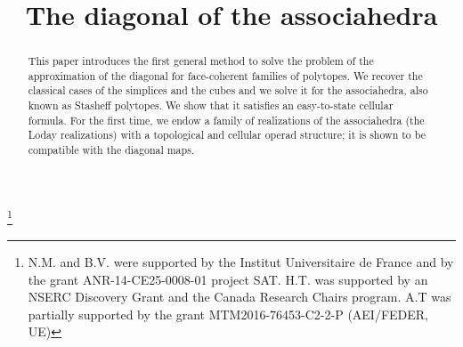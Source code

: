 \documentclass[JEP,XML,SOM,Unicode,NoFloatCountersInSection]{cedram}
\theoremstyle{plain}
\theoremstyle{definition}
\begin{document}
\frontmatter
\title{The diagonal of the associahedra}

\author[\initial{N.} \lastname{Masuda}]{ }
\address{Johns Hopkins University,
Department of Mathematics\\
3400 N. Charles Street,
Baltimore, MD 21218, USA}

\author[\initial{H.} \lastname{Thomas}]{ }
\address{Département de mathématiques,
Université du Québec à Montréal\\
Local PK-5151,
201, Avenue du Président-Kennedy,
Montréal, Canada}

\author[\initial{A.} \lastname{Tonks}]{ }
\address{Department of Mathematics,
University of Leicester,\\
University Road,
Leicester LE1 7RH,
United Kingdom}

\author[\initial{B.} \lastname{Vallette}]{\nobreakauthor{}}
\address{Laboratoire Analyse, Géométrie et Applications, Université Sorbonne Paris Nord, CNRS, UMR 7539\\
93430 Villetaneuse, France}

\thanks{N.M. and B.V. were supported by the Institut Universitaire de France and by the grant ANR-14-CE25-0008-01 project SAT. H.T. was supported by an NSERC Discovery Grant and the Canada Research Chairs program. A.T was partially supported by the grant MTM2016-76453-C2-2-P (AEI/FEDER, UE)}

\begin{abstract}
This paper introduces the first general method to solve the problem of the approximation of the diagonal for face-coherent families of polytopes. We recover the classical cases of the simplices and the cubes and we solve it for the associahedra, also known as Stasheff polytopes. We show that it satisfies an easy-to-state cellular formula. For the first time, we endow a family of realizations of the associahedra (the Loday realizations) with a topological and cellular operad structure; it is shown to be compatible with the diagonal maps.
\end{abstract}
\end{document}
